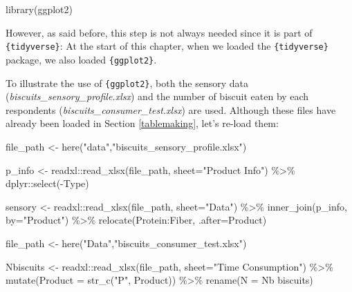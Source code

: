 \documentclass[
]{krantz}
\makeatletter
\newenvironment{Shaded}{\begin{snugshade}}{\end{snugshade}}
\newcommand{\AttributeTok}[1]{\textcolor[rgb]{0.61,0.61,0.61}{#1}}
\newcommand{\FunctionTok}[1]{\textcolor[rgb]{0,0,0}{#1}}
\newcommand{\NormalTok}[1]{#1}
\newcommand{\OtherTok}[1]{\textcolor[rgb]{0.37,0.37,0.37}{#1}}
\newcommand{\SpecialCharTok}[1]{\textcolor[rgb]{0,0,0}{#1}}
\newcommand{\StringTok}[1]{\textcolor[rgb]{0.5,0.5,0.5}{#1}}
\newenvironment{kframe}{%
\medskip{}
\setlength{\fboxsep}{.8em}
 \def\at@end@of@kframe{}%
 \ifinner\ifhmode%
  \def\at@end@of@kframe{\end{minipage}}%
  \begin{minipage}{\columnwidth}%
 \fi\fi%
 \def\FrameCommand##1{\hskip\@totalleftmargin \hskip-\fboxsep
 \colorbox{shadecolor}{##1}\hskip-\fboxsep
     \hskip-\linewidth \hskip-\@totalleftmargin \hskip\columnwidth}%
 \MakeFramed {\advance\hsize-\width
   \@totalleftmargin\z@ \linewidth\hsize
   \@setminipage}}%
 {\par\unskip\endMakeFramed%
 \at@end@of@kframe}
\renewenvironment{Shaded}{\begin{kframe}}{\end{kframe}}
\makeatother
\begin{document}
\begin{Shaded}
\begin{Highlighting}[]
\FunctionTok{library}\NormalTok{(ggplot2)}
\end{Highlighting}
\end{Shaded}

However, as said before, this step is not always needed since it is part of \texttt{\{tidyverse\}}: At the start of this chapter, when we loaded the \texttt{\{tidyverse\}} package, we also loaded \texttt{\{ggplot2\}}.

To illustrate the use of \texttt{\{ggplot2\}}, both the sensory data (\emph{biscuits\_sensory\_profile.xlsx}) and the number of biscuit eaten by each respondents (\emph{biscuits\_consumer\_test.xlsx}) are used. Although these files have already been loaded in Section \ref{tablemaking}, let's re-load them:

\begin{Shaded}
\begin{Highlighting}[]
\NormalTok{file\_path }\OtherTok{\textless{}{-}} \FunctionTok{here}\NormalTok{(}\StringTok{"data"}\NormalTok{,}\StringTok{"biscuits\_sensory\_profile.xlsx"}\NormalTok{) }

\NormalTok{p\_info }\OtherTok{\textless{}{-}}\NormalTok{ readxl}\SpecialCharTok{::}\FunctionTok{read\_xlsx}\NormalTok{(file\_path, }\AttributeTok{sheet=}\StringTok{"Product Info"}\NormalTok{) }\SpecialCharTok{\%\textgreater{}\%} 
\NormalTok{  dplyr}\SpecialCharTok{::}\FunctionTok{select}\NormalTok{(}\SpecialCharTok{{-}}\NormalTok{Type)}

\NormalTok{sensory }\OtherTok{\textless{}{-}}\NormalTok{ readxl}\SpecialCharTok{::}\FunctionTok{read\_xlsx}\NormalTok{(file\_path, }\AttributeTok{sheet=}\StringTok{"Data"}\NormalTok{) }\SpecialCharTok{\%\textgreater{}\%} 
  \FunctionTok{inner\_join}\NormalTok{(p\_info, }\AttributeTok{by=}\StringTok{"Product"}\NormalTok{) }\SpecialCharTok{\%\textgreater{}\%} 
  \FunctionTok{relocate}\NormalTok{(Protein}\SpecialCharTok{:}\NormalTok{Fiber, }\AttributeTok{.after=}\NormalTok{Product)}

\NormalTok{file\_path }\OtherTok{\textless{}{-}} \FunctionTok{here}\NormalTok{(}\StringTok{"Data"}\NormalTok{,}\StringTok{"biscuits\_consumer\_test.xlsx"}\NormalTok{)}

\NormalTok{Nbiscuits }\OtherTok{\textless{}{-}}\NormalTok{ readxl}\SpecialCharTok{::}\FunctionTok{read\_xlsx}\NormalTok{(file\_path, }\AttributeTok{sheet=}\StringTok{"Time Consumption"}\NormalTok{) }\SpecialCharTok{\%\textgreater{}\%} 
  \FunctionTok{mutate}\NormalTok{(}\AttributeTok{Product =} \FunctionTok{str\_c}\NormalTok{(}\StringTok{"P"}\NormalTok{, Product)) }\SpecialCharTok{\%\textgreater{}\%} 
  \FunctionTok{rename}\NormalTok{(}\AttributeTok{N =} \StringTok{\textasciigrave{}}\AttributeTok{Nb biscuits}\StringTok{\textasciigrave{}}\NormalTok{)}
\end{Highlighting}
\end{Shaded}
\end{document}
